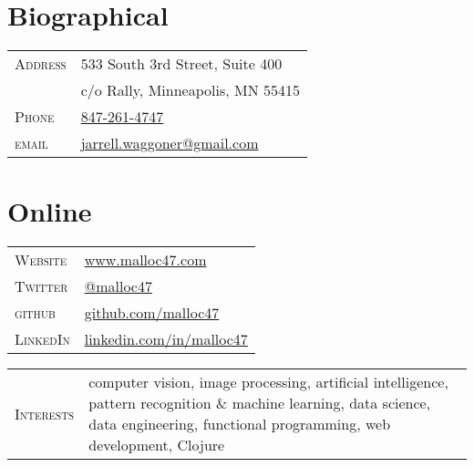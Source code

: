 \documentclass[10pt]{article}
\begin{document}
\pagestyle{empty}

\par{\bigskip\par}

\begin{multicols}{2}
\setlength{\parskip}{0pt}
\section{Biographical}

\begin{tabularx}{\linewidth}{@{}l X@{}}
  \textsc{Address} & \small{533 South 3rd Street, Suite 400} \\
                   & \small{c/o Rally, Minneapolis, MN 55415} \\
  \textsc{Phone}   & \href{tel:847-261-4747}{847-261-4747}\\
  \textsc{email}   & \href{mailto:jarrell.waggoner@gmail.com}{jarrell.waggoner@gmail.com} \\
\end{tabularx}

\vfill
\columnbreak

\section{Online}
\begin{tabularx}{\linewidth}{@{}l X@{}}
  \textsc{Website}	& \href{http://www.malloc47.com}{www.malloc47.com} \\
  \textsc{Twitter}     & \href{https://twitter.com/malloc47}{@malloc47} \\
  \textsc{github}      & \href{http://www.github.com/malloc47}{github.com/malloc47}\\
  \textsc{LinkedIn}    & \href{http://www.linkedin.com/in/malloc47}{linkedin.com/in/malloc47} \\
\end{tabularx}

\end{multicols}

\begin{tabularx}{\textwidth}{@{}l X}
  \textsc{Interests} & computer vision, image processing, artificial
  intelligence, pattern recognition \& machine learning, data science,
  data engineering, functional programming, web development, Clojure
\end{tabularx}

\newcommand{\degree}[4]{\textsc{#1} & \textbf{#2} & \textsc{#3} & \textbf{#4}\\}
\end{document}
